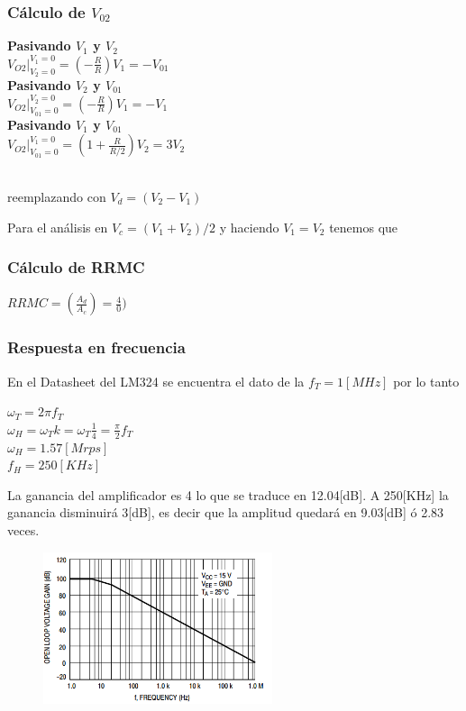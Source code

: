 \subsubsection{Cálculo de $V_{02}$}
\begin{flushleft}
	\textbf{Pasivando $V_1$ y $V_2$}\\
	$V_{O2}|^{V_1=0}_{V_2=0}=(-\frac{R}{R})V_1=-V_{01}$ \\
	\textbf{Pasivando $V_2$ y $V_{01}$} \\
	$V_{O2}|^{V_2=0}_{V_{01}=0}=(-\frac{R}{R})V_1=-V_1$ \\
	\textbf{Pasivando $V_1$ y $V_{01}$} \\
	$V_{O2}|^{V_1=0}_{V_{01}=0}=(1+\frac{R}{R/2})V_2=3V_2$ 
\end{flushleft}
\begin{center}
	\\
	reemplazando con $ V_d=(V_2-V_1)$ \\
\end{center}
\begin{flushleft}
	Para el análisis en $V_c=(V_1+V_2)/2$ y haciendo $V_1=V_2$ tenemos que \begin{center}
	\end{center}
\end{flushleft}
\subsubsection{Cálculo de RRMC}
\begin{center}
	$RRMC=(\frac{A_d}{A_c})=\frac{4}{0})$\\
\end{center}
\subsubsection{Respuesta en frecuencia}
En el Datasheet del LM324 se encuentra el dato de la $f_T=1[MHz]$ por lo tanto 
\begin{center}
	$\omega_T=2 \pi f_T$ \\
	$\omega_H = \omega_T k = \omega_T \frac{1}{4} = \frac{\pi}{2} f_T $\\
	$\omega_H = 1.57 [Mrps]$\\
	$f_H = 250 [KHz]$
\end{center}
La ganancia del amplificador es 4 lo que se traduce en 12.04[dB]. A 250[KHz]  la ganancia disminuirá 3[dB], es decir que la amplitud quedará en 9.03[dB] ó 2.83 veces.
\begin{figure}[htb]
	\centering
	\includegraphics[width=0.6\textwidth]{figuras/graf_freq_lm324.png}
\end{figure}
